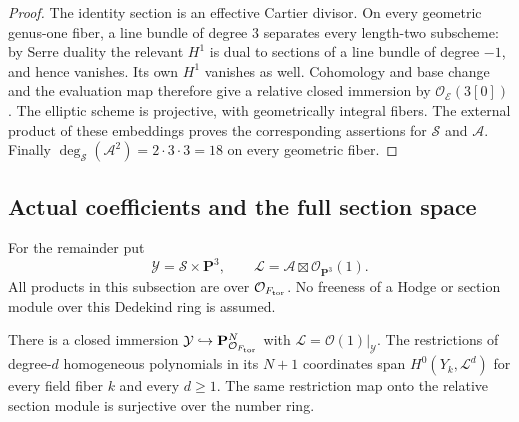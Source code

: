 \begin{proof}
The identity section is an effective Cartier divisor.
On every geometric genus-one fiber, a line bundle of
degree \(3\) separates every length-two subscheme:
by Serre duality the relevant \(H^1\) is dual to
sections of a line bundle of degree \(-1\), and hence
vanishes.  Its own \(H^1\) vanishes as well.
Cohomology and base change and the evaluation map
therefore give a relative closed immersion by
\(\mathcal O_{\mathcal E}(3[0])\).
The elliptic scheme is projective, with geometrically
integral fibers.  The external product of these
embeddings proves the corresponding assertions for
\(\mathcal S\) and \(\mathcal A\).
Finally
\(\deg_{\mathcal S}(\mathcal A^2)=2\cdot3\cdot3=18\)
on every geometric fiber.
\end{proof}

\subsection{Actual coefficients and the full section space}

For the remainder put
\[
 \mathcal Y=\mathcal S\times\mathbf P^3,\qquad
 \mathcal L=\mathcal A\boxtimes\mathcal O_{\mathbf P^3}(1).
 \tag{SG18.4}\label{r18sg:ambient}
\]
All products in this subsection are over
\(\mathcal O_{F_{\rm tor}}\).
No freeness of a Hodge or section module over this
Dedekind ring is assumed.

\begin{lemma}
\label{r18sg:coefficients}
There is a closed immersion
\(\mathcal Y\hookrightarrow\mathbf P^N_{\mathcal O_{F_{\rm tor}}}\)
with \(\mathcal L=\mathcal O(1)|_{\mathcal Y}\).
The restrictions of degree-\(d\) homogeneous polynomials
in its \(N+1\) coordinates span \(H^0(Y_k,\mathcal L^d)\)
for every field fiber \(k\) and every \(d\ge1\).
The same restriction map onto the relative section
module is surjective over the number ring.
\end{lemma}

